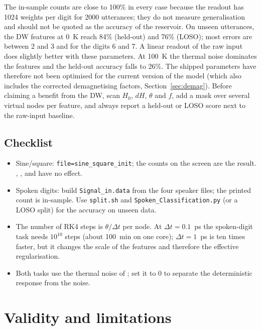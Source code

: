 \documentclass[11pt,a4paper]{report}
\newcommand{\key}[1]{\texttt{\detokenize{#1}}}
\begin{document}
The in-sample counts are close to 100\% in every case because the readout has 1024 weights per digit for 2000 utterances; they do not measure generalisation and should not be quoted as the accuracy of the reservoir. On unseen utterances, the DW features at 0~K reach 84\% (held-out) and 76\% (LOSO); most errors are between 2 and 3 and for the digits 6 and 7. A linear readout of the raw input does slightly better with these parameters. At 100~K the thermal noise dominates the features and the held-out accuracy falls to 26\%. The shipped parameters have therefore not been optimised for the current version of the model (which also includes the corrected demagnetising factors, Section~\ref{sec:demag}). Before claiming a benefit from the DW, scan $H_0$, $dH$, $\theta$ and $f$, add a mask over several virtual nodes per feature, and always report a held-out or LOSO score next to the raw-input baseline.

\section{Checklist}
\begin{itemize}
\item Sine/square: \texttt{file=sine\_square\_init}; the counts on the screen are the result. \key{lambda}, \key{lr}, \key{la} and \key{Ne} have no effect.
\item Spoken digits: build \texttt{Signal\_in.data} from the four speaker files; the printed count is in-sample. Use \texttt{split.sh} and \texttt{Spoken\_\allowbreak Classification.py} (or a LOSO split) for the accuracy on unseen data.
\item The number of RK4 steps is $\theta/\Delta t$ per node. At $\Delta t = 0.1$~ps the spoken-digit task needs $10^{10}$ steps (about 100~min on one core); $\Delta t = 1$~ps is ten times faster, but it changes the scale of the features and therefore the effective regularisation.
\item Both tasks use the thermal noise of \key{Temperature}; set it to 0 to separate the deterministic response from the noise.
\end{itemize}

\chapter{Validity and limitations}\label{ch:limits}
\end{document}
